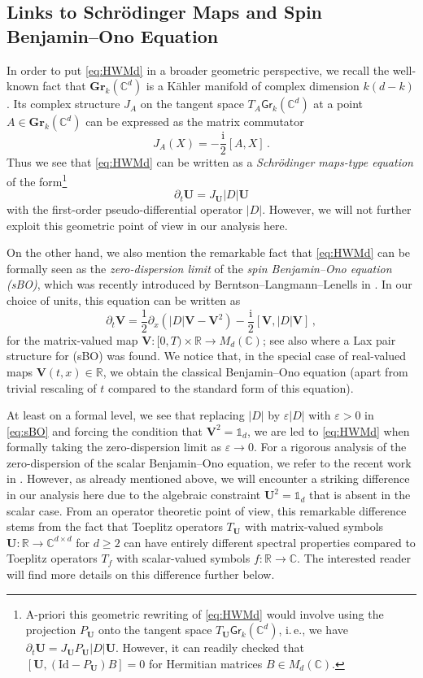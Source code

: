 \documentclass[11pt,reqno]{amsart}
\theoremstyle{definition}
\theoremstyle{remark}
\theoremstyle{remark}
\numberwithin{equation}{section}
\newcommand{\C}{\mathbb{C}}
\newcommand{\R}{\mathbb{R}}
\newcommand{\pt}{\partial}
\newcommand{\be}{\begin{equation}}
\newcommand{\ee}{\end{equation}}
\newcommand{\eps}{\varepsilon}
\newcommand{\ii}{\mathrm{i}}
\newcommand{\Vb}{\mathbf{V}}
\newcommand{\Ub}{\mathbf{U}}
\newcommand{\id}{\mathrm{Id}}
\newcommand{\Gr}{\mathsf{Gr}}
\begin{document}
\subsection*{Links to Schr\"odinger Maps and Spin Benjamin--Ono Equation} 
In order to put \eqref{eq:HWMd} in a broader geometric perspective, we recall the well-known fact that $\mathbf{Gr}_k(\C^d)$ is a K\"ahler manifold of complex dimension $k(d-k)$. Its complex structure $J_A$ on the tangent space $T_A \Gr_k(\C^d)$ at a point $A \in \mathbf{Gr}_k(\C^d)$ can be expressed as the matrix commutator
$$
J_A(X) = -\frac{\ii}{2}[A, X] \, .
$$
Thus we see that \eqref{eq:HWMd} can be written as a {\em Schr\"odinger maps-type equation} of the form\footnote{A-priori this geometric rewriting of \eqref{eq:HWMd} would involve using the projection $P_\Ub$ onto the tangent space $T_\Ub \Gr_k(\C^d)$, i.\,e., we have $\pt_t \Ub = J_{\Ub} P_\Ub |D| \Ub$. However, it can readily checked that $[\Ub, (\id-P_\Ub) B] = 0$ for Hermitian matrices $B  \in M_d(\C)$.}
\be \tag{SM}
\pt_t \Ub = J_{\Ub} |D| \Ub
\ee
with the first-order pseudo-differential operator $|D|$. However, we will not further exploit this geometric point of view in our analysis here. 

On the other hand, we also mention the remarkable fact that \eqref{eq:HWMd} can be formally seen as the {\em zero-dispersion limit} of the {\em spin Benjamin--Ono equation (sBO)}, which was recently introduced by Berntson--Langmann--Lenells in \cite{BeLaLe-22}. In our choice of units, this equation can be written as
\be \label{eq:sBO} \tag{sBO}
\pt_t \Vb = \frac{1}{2} \pt_x ( |D| \Vb - \Vb^2) - \frac{\ii}{2} [\Vb, |D| \Vb] \, ,
\ee
for the matrix-valued map $\Vb : [0,T) \times \R \to M_d(\C)$; see also \cite{Ge-23b} where a Lax pair structure for (sBO) was found. We notice that, in the special case of real-valued maps $\Vb(t,x) \in \R$, we obtain the classical Benjamin--Ono equation (apart from trivial rescaling of $t$ compared to the standard form of this equation). 

At least on a formal level, we see that replacing $|D|$ by $\eps |D|$ with $\eps > 0$ in \eqref{eq:sBO} and forcing the condition that $\Vb^2 = \mathds{1}_d$, we are led to \eqref{eq:HWMd} when formally taking the zero-dispersion limit as $\eps \to 0$. For a rigorous analysis of the zero-dispersion of the scalar Benjamin--Ono equation, we refer to the recent work in \cite{Ge-24c}. However, as already mentioned above, we will encounter a striking difference in our analysis here due to the algebraic constraint $\Ub^2 = \mathds{1}_d$ that is absent in the scalar case. From an operator theoretic point of view, this remarkable difference stems from the fact that Toeplitz operators $T_\Ub$ with matrix-valued symbols $\Ub : \R \to \C^{d \times d}$ for $d \geq 2$ can have entirely different spectral properties compared to Toeplitz operators $T_f$ with scalar-valued symbols $f : \R \to \C$. The interested reader will find more details on this difference further below. 
\end{document}
